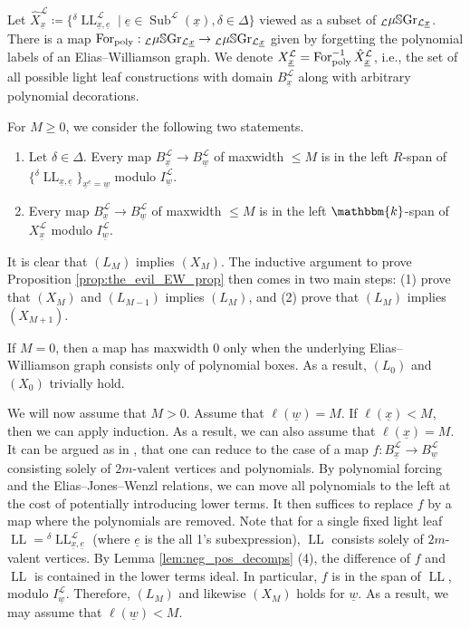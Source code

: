 \documentclass{amsart}
\renewcommand{\k}{\mathbbm{k}}
\newcommand{\scrL}{\mathcal{L}}
\DeclareMathOperator{\For}{For}
\DeclareMathOperator{\LL}{LL}
\DeclareMathOperator{\Subexp}{Sub}
\newcommand{\VSGraph}{\mu\mathbb{S}\textnormal{Gr}}
\newcommand{\ue}{\underline{e}}
\newcommand{\uw}{\underline{w}}
\newcommand{\ux}{\underline{x}}
\theoremstyle{definition}
\numberwithin{equation}{subsection}
\begin{document}
Let $\hat{X}_{\ux}^{\scrL} \coloneq \{ {}^{\delta} \LL_{\ux, \ue}^{\scrL} \mid \ue \in \Subexp^{\scrL} (\ux), \delta \in \Delta \}$ viewed as a subset of ${}_{\scrL} \VSGraph_{\scrL \ux}$.
There is a map $\For_{\textnormal{poly}} : {}_{\scrL} \VSGraph_{\scrL \ux} \to {}_{\scrL} \VSGraph_{\scrL \ux}$ given by forgetting the polynomial labels of an Elias--Williamson graph.
We denote $X_{\ux}^{\scrL} = \For_{\textnormal{poly}}^{-1} \hat{X}_{\ux}^{\scrL}$, i.e., the set of all possible light leaf constructions with domain $B_{\ux}^{\scrL}$ along with arbitrary polynomial decorations.

For $M \geq 0$, we consider the following two statements.
\begin{enumerate}
    \item[$(L_M)$] Let $\delta \in \Delta$. Every map $B_{\ux}^{\scrL} \to B_{\uw}^{\scrL}$ of maxwidth $\leq M$ is in the left $R$-span of $ \{ {}^{\delta} \LL_{\ux, \ue} \}_{\ux^{\ue} = \uw}$ modulo $I_{\uw}^{\scrL}$.
    \item[$(X_M)$] Every map $B_{\ux}^{\scrL} \to B_{\uw}^{\scrL}$ of maxwidth $\leq M$ is in the left $\k$-span of $X_{\ux}^{\scrL}$ modulo $I_{\uw}^{\scrL}$.
\end{enumerate}

It is clear that $(L_M)$ implies $(X_M)$. The inductive argument to prove Proposition \ref{prop:the_evil_EW_prop} then comes in two main steps: (1) prove that $(X_M)$ and $(L_{M-1})$ implies $(L_M)$, and (2) prove that $(L_M)$ implies $(X_{M+1})$.

If $M = 0$, then a map has maxwidth 0 only when the underlying Elias--Williamson graph consists only of polynomial boxes. 
As a result, $(L_0)$ and $(X_0)$ trivially hold.

We will now assume that $M > 0$.
Assume that $\ell (\uw) = M$. If $\ell (\ux) < M$, then we can apply induction. As a result, we can also assume that $\ell (\ux) = M$.
It can be argued as in \cite[\S 7.4]{EW}, that one can reduce to the case of a map $f : B_{\ux}^{\scrL} \to B_{\uw}^{\scrL}$ consisting solely of $2m$-valent vertices and polynomials.
By polynomial forcing and the Elias--Jones--Wenzl relations, we can move all polynomials to the left at the cost of potentially introducing lower terms.
It then suffices to replace $f$ by a map where the polynomials are removed.
Note that for a single fixed light leaf $\LL = {}^{\delta} \LL_{\ux, \ue}^{\scrL}$ (where $\ue$ is the all 1's subexpression), $\LL$ consists solely of $2m$-valent vertices.
By Lemma \ref{lem:neg_pos_decomps} (4), the difference of $f$ and $\LL$ is contained in the lower terms ideal.
In particular, $f$ is in the span of $\LL$, modulo $I_{\uw}^{\scrL}$. Therefore, $(L_M)$ and likewise $(X_M)$ holds for $\uw$.
As a result, we may assume that $\ell (\uw) < M$.
\end{document}
